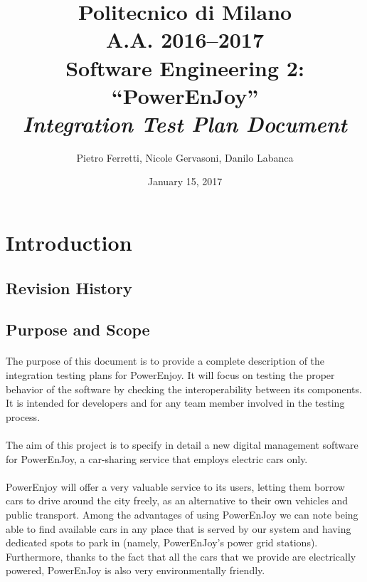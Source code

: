 \documentclass[english]{article}
\begin{document}
\title{Politecnico di Milano\\
 A.A. 2016–2017 \\
Software Engineering 2: “PowerEnJoy” \\
\emph{Integration Test Plan Document}}

\author{Pietro Ferretti, Nicole Gervasoni, Danilo Labanca}
\date{January 15, 2017}
\maketitle

\newpage

\tableofcontents{}

\newpage

\section{Introduction}

\subsection{Revision History}

\subsection{Purpose and Scope}

\paragraph{}
The purpose of this document is to provide a complete description of the integration testing plans for PowerEnjoy. It will focus on testing the proper behavior of the software by checking the 
interoperability between its components.
It is intended for developers and for any team member involved in the testing process.

\paragraph{}
The aim of this project is to specify in detail a new digital management software for PowerEnJoy, a car-sharing service that employs electric cars only.

\paragraph{}
PowerEnjoy will offer a very valuable service to its users, letting them borrow cars to drive around the city freely, as an alternative to their own vehicles and public transport.
Among the advantages of using PowerEnJoy we can note being able to find available cars in any place that is served by our system and having dedicated spots to park in (namely, PowerEnJoy's power grid stations).
Furthermore, thanks to the fact that all the cars that we provide are electrically powered, PowerEnJoy is also very environmentally friendly.
\end{document}
